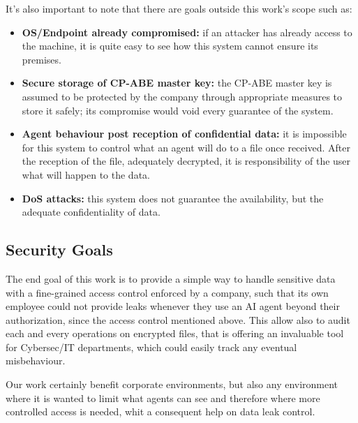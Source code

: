 It's also important to note that there are goals outside this work's scope such as:
\begin{itemize}
    \item \textbf{OS/Endpoint already compromised:} if an attacker has already access to the machine, it is quite easy to see how this system cannot ensure its premises.
    \item \textbf{Secure storage of CP-ABE master key:} the CP-ABE master key is assumed to be protected by the company through appropriate measures to store it safely; its compromise would void every guarantee of the system.
    \item \textbf{Agent behaviour post reception of confidential data:} it is impossible for this system to control what an agent will do to a file once received. After the reception of the file, adequately decrypted, it is responsibility of the user what will happen to the data.
    \item \textbf{DoS attacks:} this system does not guarantee the availability, but the adequate confidentiality of data.
\end{itemize}
\subsection{Security Goals}
The end goal of this work is to provide a simple way to handle sensitive data with a fine-grained access control enforced by a company, such that its own employee could not provide leaks whenever they use an AI agent beyond their authorization, since the access control mentioned above.
This allow also to audit each and every operations on encrypted files, that is offering an invaluable tool for Cybersec/IT departments, which could easily track any eventual misbehaviour.

Our work certainly benefit corporate environments, but also any environment where it is wanted to limit what agents can see and therefore where more controlled access is needed, whit a consequent help on data leak control.